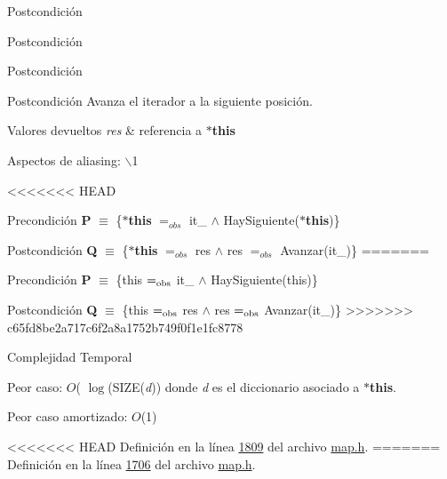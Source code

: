 \begin{Indent}
\begin{DoxyPostcond}{\-Postcondición}
\begin{DoxyPostcond}{\-Postcondición}
\begin{DoxyPostcond}{\-Postcondición}
\begin{DoxyPostcond}{\-Postcondición}
\-Avanza el iterador a la siguiente posición. 


\begin{DoxyRetVals}{\-Valores devueltos}
{\em res} & referencia a {\bfseries $\ast$this}\\
\hline
\end{DoxyRetVals}
\begin{DoxyParagraph}{\-Aspectos de aliasing\-:}
$\backslash$1
\end{DoxyParagraph}
<<<<<<< HEAD
\begin{DoxyPrecond}{\-Precondición}
{\bfseries \-P} $\equiv$ \{{\bfseries $\ast$this} $=_{obs}$ it\-\_ $\land$ \-Hay\-Siguiente({\bfseries $\ast$this})\} 
\end{DoxyPrecond}
\begin{DoxyPostcond}{\-Postcondición}
{\bfseries \-Q} $\equiv$ \{{\bfseries $\ast$this} $=_{obs}$ res $\land$ res $=_{obs}$ \-Avanzar(it\-\_)\}
=======
\begin{DoxyPrecond}{Precondición}
{\bfseries P} $\equiv$ \{this $=_{\rm obs}$ it\+\_ $\land$ Hay\+Siguiente(this)\} 
\end{DoxyPrecond}
\begin{DoxyPostcond}{Postcondición}
{\bfseries Q} $\equiv$ \{this $=_{\rm obs}$ res $\land$ res $=_{\rm obs}$ Avanzar(it\+\_)\}
>>>>>>> c65fd8be2a717c6f2a8a1752b749f0f1e1fc8778
\end{DoxyPostcond}

\begin{DoxyDescription}
\item[\-Complejidad \-Temporal]
\begin{DoxyItemize}
\item \-Peor caso\-: $O$( $\log$(\-S\-I\-Z\-E({\itshape d\/})) donde {\itshape d\/} es el diccionario asociado a {\bfseries $\ast$this}.
\item \-Peor caso amortizado\-: $O$(1) 
\end{DoxyItemize}
\end{DoxyDescription}

<<<<<<< HEAD
\-Definición en la línea \hyperlink{map_8h_source_l01809}{1809} del archivo \hyperlink{map_8h_source}{map.\-h}.
=======
Definición en la línea \hyperlink{map_8h_source_l01706}{1706} del archivo \hyperlink{map_8h_source}{map.\+h}.

\mbox{\label{classaed2_1_1map_1_1iterator_af4fe5565eb478cfccd254b2ef230b974_af4fe5565eb478cfccd254b2ef230b974}} 

\end{DoxyPostcond}
\end{DoxyPostcond}
\end{DoxyPostcond}
\end{DoxyPostcond}
\end{DoxyPostcond}
\end{Indent}

